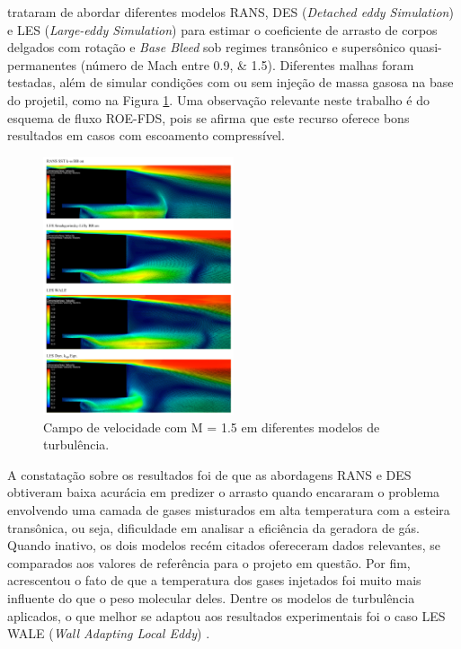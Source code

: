 \cite{nicolas-perez_accuracy_2017} trataram de abordar diferentes modelos RANS, DES (\textit{Detached eddy Simulation}) e LES (\textit{Large-eddy Simulation}) para estimar o coeficiente de arrasto de corpos delgados com rotação e \textit{Base Bleed} sob regimes transônico e supersônico quasi-permanentes (número de Mach entre \numlist{0,9;1,5}). Diferentes malhas foram testadas, além de simular condições com ou sem injeção de massa gasosa na base do projetil, como na Figura \ref{fig10:nicolas2017}. Uma observação relevante neste trabalho é do esquema de fluxo ROE-FDS, pois se afirma que este recurso oferece bons resultados em casos com escoamento compressível.

\begin{figure}[!ht]
	\centering
    \includegraphics[width=0.5\textwidth]{chapter-01/img-cap01/foto10-nicolas2017}
	\caption[Campo de velocidade com M = \num{1,5} em diferentes modelos de turbulência.]{Campo de velocidade com M = \num{1,5} em diferentes modelos de turbulência. \cite{nicolas-perez_accuracy_2017}}
	\label{fig10:nicolas2017}
\end{figure}

A constatação sobre os resultados foi de que as abordagens RANS e DES obtiveram baixa acurácia em predizer o arrasto quando encararam o problema envolvendo uma camada de gases misturados em alta temperatura com a esteira transônica, ou seja, dificuldade em analisar a eficiência da geradora de gás. Quando inativo, os dois modelos recém citados ofereceram dados relevantes, se comparados aos valores de referência para o projeto em questão. Por fim, acrescentou o fato de que a temperatura dos gases injetados foi muito mais influente do que o peso molecular deles. Dentre os modelos de turbulência aplicados, o que melhor se adaptou aos resultados experimentais foi o caso LES WALE (\textit{Wall Adapting Local Eddy}) \cite{nicolas-perez_accuracy_2017}.

